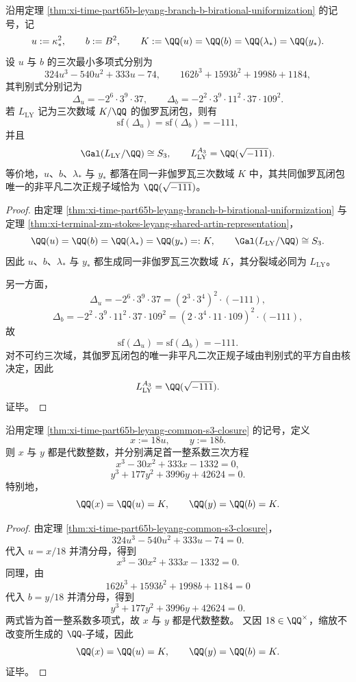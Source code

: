 \begin{theorem}\label{thm:xi-time-part65b-leyang-common-s3-closure}
沿用定理 \ref{thm:xi-time-part65b-leyang-branch-b-birational-uniformization} 的记号，记
\[
u:=\kappa_*^2,
\qquad
b:=B^2,
\qquad
K:=\QQ(u)=\QQ(b)=\QQ(\lambda_*)=\QQ(y_*).
\]
设 \(u\) 与 \(b\) 的三次最小多项式分别为
\[
324u^3-540u^2+333u-74,
\qquad
162b^3+1593b^2+1998b+1184,
\]
其判别式分别记为
\[
\Delta_u=-2^6\cdot 3^9\cdot 37,
\qquad
\Delta_b=-2^2\cdot 3^9\cdot 11^2\cdot 37\cdot 109^2.
\]
若 \(L_{\mathrm{LY}}\) 记为三次数域 \(K/\QQ\) 的伽罗瓦闭包，则有
\[
\mathrm{sf}(\Delta_u)=\mathrm{sf}(\Delta_b)=-111,
\]
并且
\[
\Gal(L_{\mathrm{LY}}/\QQ)\cong S_3,
\qquad
L_{\mathrm{LY}}^{A_3}=\QQ(\sqrt{-111}).
\]
等价地，\(u\)、\(b\)、\(\lambda_*\) 与 \(y_*\) 都落在同一非伽罗瓦三次数域 \(K\) 中，其共同伽罗瓦闭包唯一的非平凡二次正规子域恰为 \(\QQ(\sqrt{-111})\)。
\end{theorem}
\begin{proof}
由定理 \ref{thm:xi-time-part65b-leyang-branch-b-birational-uniformization} 与定理 \ref{thm:xi-terminal-zm-stokes-leyang-shared-artin-representation}，
\[
\QQ(u)=\QQ(b)=\QQ(\lambda_*)=\QQ(y_*)=:K,
\qquad
\Gal(L_{\mathrm{LY}}/\QQ)\cong S_3.
\]
因此 \(u\)、\(b\)、\(\lambda_*\) 与 \(y_*\) 都生成同一非伽罗瓦三次数域 \(K\)，其分裂域必同为 \(L_{\mathrm{LY}}\)。

另一方面，
\[
\Delta_u
=
-2^6\cdot 3^9\cdot 37
=
(2^3\cdot 3^4)^2\cdot (-111),
\]
\[
\Delta_b
=
-2^2\cdot 3^9\cdot 11^2\cdot 37\cdot 109^2
=
(2\cdot 3^4\cdot 11\cdot 109)^2\cdot (-111),
\]
故
\[
\mathrm{sf}(\Delta_u)=\mathrm{sf}(\Delta_b)=-111.
\]
对不可约三次域，其伽罗瓦闭包的唯一非平凡二次正规子域由判别式的平方自由核决定，因此
\[
L_{\mathrm{LY}}^{A_3}=\QQ(\sqrt{-111}).
\]
证毕。
\end{proof}

\begin{proposition}\label{prop:xi-time-part65b-leyang-u-b-integral-generators}
沿用定理 \ref{thm:xi-time-part65b-leyang-common-s3-closure} 的记号，定义
\[
x:=18u,
\qquad
y:=18b.
\]
则 \(x\) 与 \(y\) 都是代数整数，并分别满足首一整系数三次方程
\[
x^3-30x^2+333x-1332=0,
\]
\[
y^3+177y^2+3996y+42624=0.
\]
特别地，
\[
\QQ(x)=\QQ(u)=K,
\qquad
\QQ(y)=\QQ(b)=K.
\]
\end{proposition}
\begin{proof}
由定理 \ref{thm:xi-time-part65b-leyang-common-s3-closure}，
\[
324u^3-540u^2+333u-74=0.
\]
代入 \(u=x/18\) 并清分母，得到
\[
x^3-30x^2+333x-1332=0.
\]
同理，由
\[
162b^3+1593b^2+1998b+1184=0
\]
代入 \(b=y/18\) 并清分母，得到
\[
y^3+177y^2+3996y+42624=0.
\]
两式皆为首一整系数多项式，故 \(x\) 与 \(y\) 都是代数整数。
又因 \(18\in \QQ^\times\)，缩放不改变所生成的 \(\QQ\)-子域，因此
\[
\QQ(x)=\QQ(u)=K,
\qquad
\QQ(y)=\QQ(b)=K.
\]
证毕。
\end{proof}

